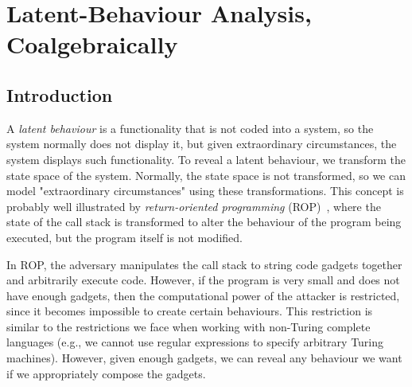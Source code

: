 

\chapter{Latent-Behaviour Analysis, Coalgebraically} %
\label{ch:LatentBehaviours} %

\section{Introduction}

A \emph{latent behaviour} is a functionality that is not coded into a system, so the system normally does not display it, but given extraordinary circumstances, the system displays such functionality. To reveal a latent behaviour, we transform the state space of the system. Normally, the state space is not transformed, so we can model "extraordinary circumstances" using these transformations. This concept is probably well illustrated by \emph{return-oriented programming} (ROP)~\cite{ROP}, where the state of the call stack is transformed to alter the behaviour of the program being executed, but the program itself is not modified.

In ROP, the adversary manipulates the call stack to string code gadgets together and arbitrarily execute code. However, if the program is very small and does not have enough gadgets, then the computational power of the attacker is restricted, since it becomes impossible to create certain behaviours. This restriction is similar to the restrictions we face when working with non-Turing complete languages (e.g., we cannot use regular expressions to specify arbitrary Turing machines). However, given enough gadgets, we can reveal any behaviour we want if we appropriately compose the gadgets.

